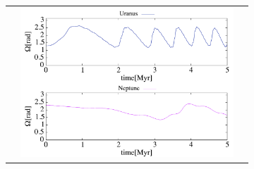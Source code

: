\documentclass[11pt,a4paper,oneside,onecolumn]{jarticle}
\begin{document}
\begin{figure}[H]
\begin{tabular}{ccc}
\begin{minipage}[t]{0.1\hsize}
\end{minipage} &
\begin{minipage}[t]{0.45\hsize}
\centering
\includegraphics[width=8cm]{./image/Move500kyr_capitalOMEGA_5Myr_URANEP.pdf}
\end{minipage}
%
\end{tabular}
\caption{\label{}}
\end{figure}
\end{document}
